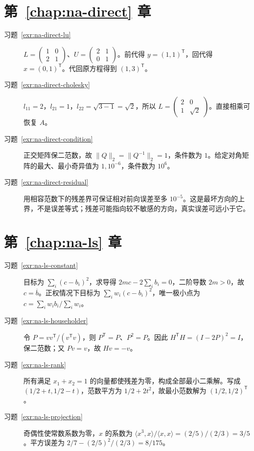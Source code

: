 \documentclass[UTF8,12pt,a4paper,fontset=fandol]{ctexbook}
\begin{document}
\section{第~\ref{chap:na-direct} 章}
\begin{description}
\item[习题~\ref{exr:na-direct-lu}] $L=\begin{pmatrix}1&0\\2&1\end{pmatrix}$、$U=\begin{pmatrix}2&1\\0&1\end{pmatrix}$。前代得 $y=(1,1)^{\mathsf T}$，回代得 $x=(0,1)^{\mathsf T}$。代回原方程得到 $(1,3)^{\mathsf T}$。
\item[习题~\ref{exr:na-direct-cholesky}] $l_{11}=2$，$l_{21}=1$，$l_{22}=\sqrt{3-1}=\sqrt2$，所以 $L=\begin{pmatrix}2&0\\1&\sqrt2\end{pmatrix}$。直接相乘可恢复 $A$。
\item[习题~\ref{exr:na-direct-condition}] 正交矩阵保二范数，故 $\|Q\|_2=\|Q^{-1}\|_2=1$，条件数为 $1$。给定对角矩阵的最大、最小奇异值为 $1,10^{-6}$，条件数为 $10^6$。
\item[习题~\ref{exr:na-direct-residual}] 用相容范数下的残差界可保证相对前向误差至多 $10^{-5}$。这是最坏方向的上界，不是误差等式；残差可能指向较不敏感的方向，真实误差可远小于它。
\end{description}

\section{第~\ref{chap:na-ls} 章}
\begin{description}
\item[习题~\ref{exr:na-ls-constant}] 目标为 $\sum_i(c-b_i)^2$，求导得 $2mc-2\sum_i b_i=0$，二阶导数 $2m>0$，故 $c=\overline b$。正权情况下目标为 $\sum_iw_i(c-b_i)^2$，唯一极小点为 $c=\sum_iw_ib_i/\sum_iw_i$。
\item[习题~\ref{exr:na-ls-householder}] 令 $P=vv^{\mathsf T}/(v^{\mathsf T}v)$，则 $P^{\mathsf T}=P$、$P^2=P$。因此 $H^{\mathsf T}H=(I-2P)^2=I$，保二范数；又 $Pv=v$，故 $Hv=-v$。
\item[习题~\ref{exr:na-ls-rank}] 所有满足 $x_1+x_2=1$ 的向量都使残差为零，构成全部最小二乘解。写成 $(1/2+t,1/2-t)$，范数平方为 $1/2+2t^2$，故最小范数解为 $(1/2,1/2)^{\mathsf T}$。
\item[习题~\ref{exr:na-ls-projection}] 奇偶性使常数系数为零，$x$ 的系数为 $\langle x^3,x\rangle/\langle x,x\rangle=(2/5)/(2/3)=3/5$。平方误差为 $2/7-(2/5)^2/(2/3)=8/175$。
\end{description}
\end{document}
